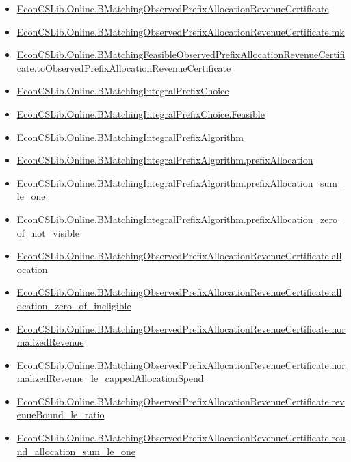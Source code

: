 \documentclass[10pt]{article}
\begin{document}
\begin{itemize}[leftmargin=1.2em]
\begin{itemize}[leftmargin=1.2em]
\item \hyperlink{library-prerequisite-f29fbc85af214257}{EconCSLib.Online.BMatchingObservedPrefixAllocationRevenueCertificate}
\item \hyperlink{library-prerequisite-9ab8fbfb655afd49}{EconCSLib.Online.BMatchingObservedPrefixAllocationRevenueCertificate.mk}
\item \hyperlink{library-prerequisite-198023da747788b3}{EconCSLib.Online.BMatchingFeasibleObservedPrefixAllocationRevenueCertificate.toObservedPrefixAllocationRevenueCertificate}
\item \hyperlink{library-prerequisite-892cdd799cfc8173}{EconCSLib.Online.BMatchingIntegralPrefixChoice}
\item \hyperlink{library-prerequisite-7d956bb020026727}{EconCSLib.Online.BMatchingIntegralPrefixChoice.Feasible}
\item \hyperlink{library-prerequisite-9579a86d5da79b75}{EconCSLib.Online.BMatchingIntegralPrefixAlgorithm}
\item \hyperlink{library-prerequisite-2a022d5ffe979715}{EconCSLib.Online.BMatchingIntegralPrefixAlgorithm.prefixAllocation}
\item \hyperlink{library-prerequisite-97b5a2c72af8c15d}{EconCSLib.Online.BMatchingIntegralPrefixAlgorithm.prefixAllocation\_sum\_le\_one}
\item \hyperlink{library-prerequisite-716582a2b19b88f3}{EconCSLib.Online.BMatchingIntegralPrefixAlgorithm.prefixAllocation\_zero\_of\_not\_visible}
\item \hyperlink{library-prerequisite-a5b93d154a053c83}{EconCSLib.Online.BMatchingObservedPrefixAllocationRevenueCertificate.allocation}
\item \hyperlink{library-prerequisite-75c18209a9e844a0}{EconCSLib.Online.BMatchingObservedPrefixAllocationRevenueCertificate.allocation\_zero\_of\_ineligible}
\item \hyperlink{library-prerequisite-eab8d70463a5eaa2}{EconCSLib.Online.BMatchingObservedPrefixAllocationRevenueCertificate.normalizedRevenue}
\item \hyperlink{library-prerequisite-9c71790e37731f77}{EconCSLib.Online.BMatchingObservedPrefixAllocationRevenueCertificate.normalizedRevenue\_le\_cappedAllocationSpend}
\item \hyperlink{library-prerequisite-aa1a3ea7e7e909ac}{EconCSLib.Online.BMatchingObservedPrefixAllocationRevenueCertificate.revenueBound\_le\_ratio}
\item \hyperlink{library-prerequisite-e3b4843ea70611cb}{EconCSLib.Online.BMatchingObservedPrefixAllocationRevenueCertificate.round\_allocation\_sum\_le\_one}

\end{itemize}
\end{itemize}
\end{document}
